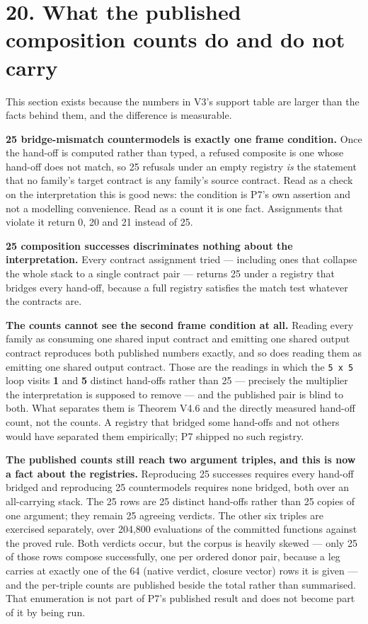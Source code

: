 \section{20. What the published composition counts do and do not carry}

This section exists because the numbers in V3's support table are larger than
the facts behind them, and the difference is measurable.

\textbf{25 bridge-mismatch countermodels is exactly one frame condition.} Once the
hand-off is computed rather than typed, a refused composite is one whose
hand-off does not match, so 25 refusals under an empty registry \emph{is} the
statement that no family's target contract is any family's source contract. Read
as a check on the interpretation this is good news: the condition is P7's own
assertion and not a modelling convenience. Read as a count it is one fact.
Assignments that violate it return 0, 20 and 21 instead of 25.

\textbf{25 composition successes discriminates nothing about the interpretation.}
Every contract assignment tried --- including ones that collapse the whole stack to
a single contract pair --- returns 25 under a registry that bridges every hand-off,
because a full registry satisfies the match test whatever the contracts are.

\textbf{The counts cannot see the second frame condition at all.} Reading every family
as consuming one shared input contract and emitting one shared output contract
reproduces both published numbers exactly, and so does reading them as emitting
one shared output contract. Those are the readings in which the \texttt{5 x 5} loop
visits \textbf{1} and \textbf{5} distinct hand-offs rather than 25 --- precisely the
multiplier the interpretation is supposed to remove --- and the published pair is
blind to both. What separates them is Theorem V4.6 and the directly measured
hand-off count, not the counts. A registry that bridged some hand-offs and not
others would have separated them empirically; P7 shipped no such registry.

\textbf{The published counts still reach two argument triples, and this is now a fact
about the registries.} Reproducing 25 successes requires every hand-off bridged
and reproducing 25 countermodels requires none bridged, both over an all-carrying
stack. The 25 rows are 25 distinct hand-offs rather than 25 copies of one
argument; they remain 25 agreeing verdicts. The other six triples are exercised
separately, over 204,800 evaluations of the committed functions against the
proved rule. Both verdicts occur, but the corpus is heavily skewed --- only 25 of
those rows compose successfully, one per ordered donor pair, because a leg
carries at exactly one of the 64 (native verdict, closure vector) rows it is
given --- and the per-triple counts are published beside the total rather than
summarised. That enumeration is not part
of P7's published result and does not become part of it by being run.

